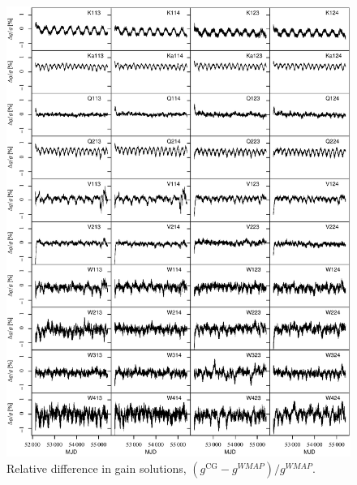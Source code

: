 \documentclass[twocolumn]{../../common/aa}
\begin{document}
\begin{figure}[p]
	\centering
	\includegraphics[width=\textwidth]{figures/instpar_CG_dgain_v1.pdf}
	\caption{Relative difference in gain solutions, $(g^\mathrm{CG}-g^\mathit{WMAP})/g^\mathit{WMAP}$.}
	\label{fig:dgain}
\end{figure}
\end{document}
